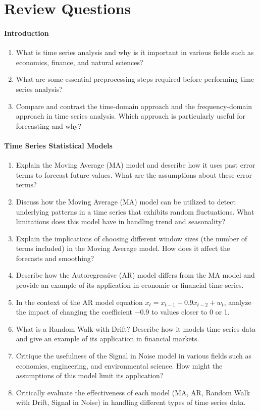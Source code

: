 \FloatBarrier
\section{Review Questions}

\paragraph*{Introduction}
\begin{enumerate}[nosep]
    \item What is time series analysis and why is it important in various fields such as economics, finance, and natural sciences?
    \item What are some essential preprocessing steps required before performing time series analysis?
    \item Compare and contrast the time-domain approach and the frequency-domain approach in time series analysis. Which approach is particularly useful for forecasting and why?
\end{enumerate}
\paragraph*{Time Series Statistical Models}
\begin{enumerate}
    \item Explain the Moving Average (MA) model and describe how it uses past error terms to forecast future values. What are the assumptions about these error terms?
    \item Discuss how the Moving Average (MA) model can be utilized to detect underlying patterns in a time series that exhibits random fluctuations. What limitations does this model have in handling trend and seasonality?
    \item Explain the implications of choosing different window sizes (the number of terms included) in the Moving Average model. How does it affect the forecasts and smoothing?
    \item Describe how the Autoregressive (AR) model differs from the MA model and provide an example of its application in economic or financial time series.
    \item In the context of the AR model equation $x_t = x_{t-1} - 0.9 x_{t-2} + w_t$, analyze the impact of changing the coefficient $-0.9$ to values closer to 0 or 1.
    \item What is a Random Walk with Drift? Describe how it models time series data and give an example of its application in financial markets.
    \item Critique the usefulness of the Signal in Noise model in various fields such as economics, engineering, and environmental science. How might the assumptions of this model limit its application?
    \item Critically evaluate the effectiveness of each model (MA, AR, Random Walk with Drift, Signal in Noise) in handling different types of time series data.
\end{enumerate}
